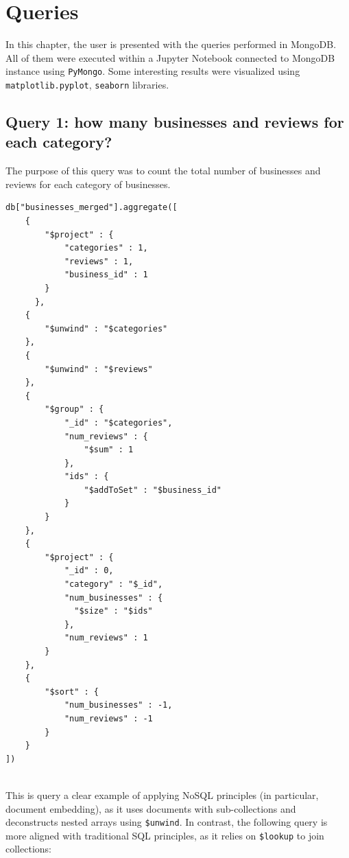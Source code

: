 \documentclass{Configuration_Files/PoliMi3i_thesis}
\begin{document}
\cleardoublepage

\chapter{Queries}
In this chapter, the user is presented with the queries performed in MongoDB. All of them were executed within a Jupyter Notebook connected to MongoDB instance using \texttt{PyMongo}. Some interesting results were visualized using \texttt{matplotlib.pyplot}, \texttt{seaborn} libraries.

\section{Query 1: how many businesses and reviews for each category?}

The purpose of this query was to count the total number of businesses and reviews for each category of businesses.

\bigskip
    
\begin{lstlisting}[style=mongodb]
db["businesses_merged"].aggregate([
    {
        "$project" : {
            "categories" : 1,
            "reviews" : 1,
            "business_id" : 1
        }
      },
    {
        "$unwind" : "$categories"
    },
    {
        "$unwind" : "$reviews"
    },
    {
        "$group" : {
            "_id" : "$categories",
            "num_reviews" : {
                "$sum" : 1
            },
            "ids" : {
                "$addToSet" : "$business_id"
            }
        }
    },
    {
        "$project" : {
            "_id" : 0,
            "category" : "$_id",
            "num_businesses" : {
              "$size" : "$ids"
            },
            "num_reviews" : 1
        }
    },
    {
        "$sort" : {
            "num_businesses" : -1,
            "num_reviews" : -1
        }
    }
])
 
\end{lstlisting}

\bigskip

This is query a clear example of applying NoSQL principles (in particular, document embedding), as it uses documents with sub-collections and deconstructs nested arrays using \texttt{\$unwind}. In contrast, the following query is more aligned with traditional SQL principles, as it relies on \texttt{\$lookup} to join collections:

\bigskip
    
\end{document}
